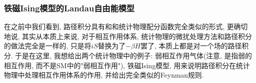 \subsubsection{铁磁Ising模型的Landau自由能模型}
在之前中我们看到, 路径积分具有和和统计物理配分函数完全类似的形式, 更确切地说, 其实从本质上来说, 对于相互作用体系, 统计物理的微扰处理方法和路径积分的做法完全是一样的, 只是将$iS$替换为了$-\beta H$罢了, 本质上都是对一个场的路径积分. 于是在这里, 我想给出两个统计物理中的例子: 弱相互作用气体(注意, 是指弱的相互作用, 而不是SM中的"弱相互作用")\cite{SchroederClusterExpansion}, 铁磁Ising模型\cite{LiuChuanIsing}, 用来说明路径积分在统计物理中处理相互作用体系的作用, 并给出完全类似的Feynman规则.
